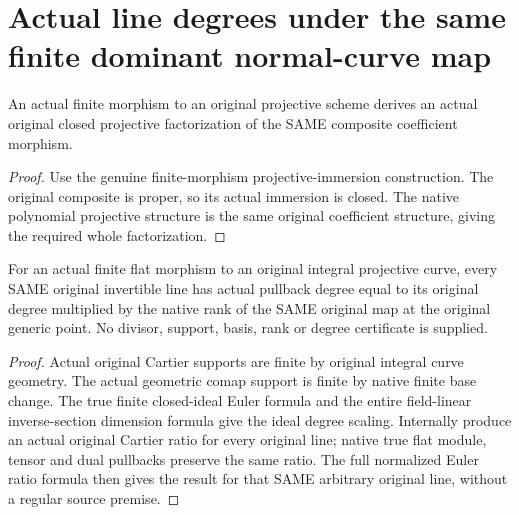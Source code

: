 \section{Actual line degrees under the same finite dominant normal-curve map}

\begin{theorem}
\label{thm:fc-curve-finite-map-projective}
\leanok
{}
An actual finite morphism to an original projective scheme derives
an actual original closed projective factorization of the SAME
composite coefficient morphism.
\end{theorem}
\begin{proof}
Use the genuine finite-morphism projective-immersion construction.
The original composite is proper, so its actual immersion is closed.
The native polynomial projective structure is the same original
coefficient structure, giving the required whole factorization.
\end{proof}

\begin{theorem}
\label{thm:fc-curve-finite-flat-line-degree}
\leanok
{}
For an actual finite flat morphism to an original integral
projective curve, every SAME original invertible line has actual
pullback degree equal to its original degree multiplied by the
native rank of the SAME original map at the original generic
point. No divisor, support, basis, rank or degree certificate is
supplied.
\end{theorem}
\begin{proof}
Actual original Cartier supports are finite by original integral
curve geometry. The actual geometric comap support is finite by
native finite base change. The true finite closed-ideal Euler
formula and the entire field-linear inverse-section dimension
formula give the ideal degree scaling. Internally produce an actual
original Cartier ratio for every original line; native true
flat module, tensor and dual pullbacks preserve the same ratio.
The full normalized Euler ratio formula then gives the result for
that SAME arbitrary original line, without a regular source premise.
\end{proof}

